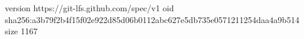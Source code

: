 version https://git-lfs.github.com/spec/v1
oid sha256:a3b79f2b4f15f02e922d85d06b0112abc627e5db735e0571211254daa4a9b514
size 1167
